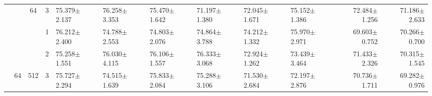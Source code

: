 \begin{table}[htpb]
{\begin{tabular}{c|c|c|c|ll|ll|ll|ll}
                                 &                                                                                 & \multirow{-3}{*}{64}                                                                   & 3                                                                                         & 75.379$\pm$2.137                        & 76.258$\pm$3.353                        & 75.470$\pm$1.642                        & 71.197$\pm$1.380                        & 72.045$\pm$1.671                        & 75.152$\pm$1.386                        & \multicolumn{1}{r}{72.484$\pm$1.256}    & \multicolumn{1}{r}{71.186$\pm$2.633}   \\ \cline{3-12} 
                                 &                                                                                 &                                                                                        & 1                                                                                         & 76.212$\pm$2.400                        & 74.788$\pm$2.553                        & 74.803$\pm$2.076                        & 74.864$\pm$3.788                        & 74.212$\pm$1.332                        & 75.970$\pm$2.971                        & \multicolumn{1}{r}{69.603$\pm$0.752}    & \multicolumn{1}{r}{70.266$\pm$0.700}   \\
                                 &                                                                                 &                                                                                        & 2                                                                                         & 75.258$\pm$1.551                        & 76.030$\pm$4.115                        & 76.106$\pm$1.557                        & 76.333$\pm$3.068                        & 72.924$\pm$1.262                        & 73.439$\pm$3.464                        & \multicolumn{1}{r}{71.433$\pm$2.326}    & \multicolumn{1}{r}{70.315$\pm$1.545}   \\
                                 & \multirow{-6}{*}{64}                                                            & \multirow{-3}{*}{512}                                                                  & 3                                                                                         & 75.727$\pm$2.294                        & 74.515$\pm$1.639                        & 75.833$\pm$2.084                        & 75.288$\pm$3.106                        & 71.530$\pm$2.684                        & 72.197$\pm$2.876                        & \multicolumn{1}{r}{70.736$\pm$1.711}    & \multicolumn{1}{r}{69.282$\pm$0.976}   \\ \cline{2-12} 

\end{tabular}}
\end{table}
